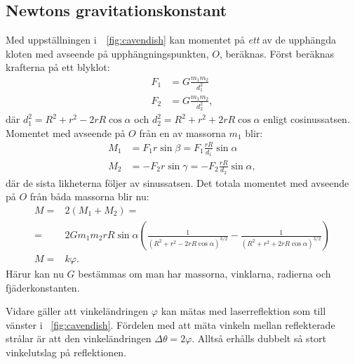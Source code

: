 \documentclass[11pt,a4paper]{article}
\newcommand{\figref}{\figurename~\ref}
\begin{document}
\subsection{Newtons gravitationskonstant}\label{sec:cavendish}
Med uppställningen i~\figref{fig:cavendish} kan momentet på \emph{ett} av de upphängda kloten med avseende på upphängningspunkten, $O$, beräknas. Först beräknas krafterna på ett blyklot:
\begin{equation*}
\begin{aligned}
F_1&=G\frac{m_1 m_2}{d_1^2}\\
F_2&=G\frac{m_1 m_2}{d_2^2},
\end{aligned}
\end{equation*}
där $d_1^2=R^2+r^2-2rR\cos\alpha$ och $d_2^2=R^2+r^2+2rR\cos\alpha$ enligt cosinussatsen.
Momentet med avseende på $O$ från en av massorna $m_1$ blir:
\begin{equation*}
\begin{aligned}
M_1&=F_1 r\sin{\beta}=F_1 \frac{rR}{d_1}\sin\alpha\\
M_2&=-F_2 r\sin{\gamma}=-F_2 \frac{rR}{d_2}\sin\alpha,
\end{aligned}
\end{equation*}
där de sista likheterna följer av sinussatsen. Det totala momentet med avseende på $O$ från båda massorna blir nu:
\begin{equation}\label{eq:moment}
\begin{aligned}
M=&2(M_1+M_2)=\\
 =& 2G m_1 m_2 r R \sin\alpha
\left( \frac{1}{(R^2+r^2-2rR\cos\alpha)^{3/2}} - \frac{1}{(R^2+r^2+2rR\cos\alpha)^{3/2}} \right)\\
M=& k\varphi.
\end{aligned}
\end{equation}
Härur kan nu $G$ bestämmas om man har massorna, vinklarna, radierna och fjäderkonstanten.

Vidare gäller att vinkeländringen $\varphi$ kan mätas med laserreflektion som till vänster i \figref{fig:cavendish}. Fördelen med att mäta vinkeln mellan reflekterade strålar är att den vinkeländringen $\Delta\theta=2\varphi$. Alltså erhålls dubbelt så stort vinkelutslag på reflektionen.
\end{document}
